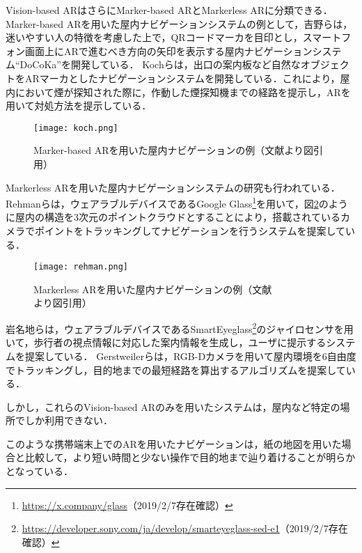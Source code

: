     Vision-based ARはさらにMarker-based ARとMarkerless ARに分類できる\cite{Rabbi:2013}．
    Marker-based ARを用いた屋内ナビゲーションシステムの例として，吉野らは，迷いやすい人の特徴を考慮した上で，QRコードマーカを目印とし，スマートフォン画面上にARで進むべき方向の矢印を表示する屋内ナビゲーションシステム``DoCoKa''を開発している\cite{Yoshino:2013}．
    Kochらは，出口の案内板など自然なオブジェクトをARマーカとしたナビゲーションシステムを開発している\cite{Koch:2014}．これにより，屋内において煙が探知された際に，作動した煙探知機までの経路を提示し，ARを用いて対処方法を提示している．
    \begin{figure}[tb]
      \centerline{\texttt{[image: koch.png]}}
      \caption{Marker-based ARを用いた屋内ナビゲーションの例（文献\cite{Koch:2014}より図引用）}
      \label{figure:koch}
    \end{figure}

    Markerless ARを用いた屋内ナビゲーションシステムの研究も行われている．
    Rehmanらは，ウェアラブルデバイスであるGoogle Glass\footnote{\url{https://x.company/glass}（2019/2/7存在確認）}を用いて，図\ref{figure:rehman}のように屋内の構造を3次元のポイントクラウドとすることにより，搭載されているカメラでポイントをトラッキングしてナビゲーションを行うシステムを提案している\cite{Rehman:2015}．
    \begin{figure}[tb]
      \centerline{\texttt{[image: rehman.png]}}
      \caption{Markerless ARを用いた屋内ナビゲーションの例（文献\cite{Rehman:2015}より図引用）}
      \label{figure:rehman}
    \end{figure}
    岩名地らは，ウェアラブルデバイスであるSmartEyeglass\footnote{\url{https://developer.sony.com/ja/develop/smarteyeglass-sed-e1}（2019/2/7存在確認）}のジャイロセンサを用いて，歩行者の視点情報に対応した案内情報を生成し，ユーザに提示するシステムを提案している\cite{Iwanaji:2016}．
    Gerstweilerらは，RGB-Dカメラを用いて屋内環境を6自由度でトラッキングし，目的地までの最短経路を算出するアルゴリズムを提案している\cite{Gerstweiler:2018}．

    しかし，これらのVision-based ARのみを用いたシステムは，屋内など特定の場所でしか利用できない．
    
    このような携帯端末上でのARを用いたナビゲーションは，紙の地図を用いた場合と比較して，より短い時間と少ない操作で目的地まで辿り着けることが明らかとなっている\cite{Rehman:2017, Yoshino:2013}．
    

